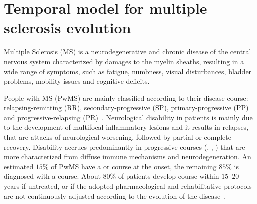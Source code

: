 
\chapter{Temporal model for multiple sclerosis evolution} \label{chap:aism}


Multiple Sclerosis (MS) is a neurodegenerative and chronic disease of the central nervous system characterized by damages to the myelin sheaths, resulting in a wide range of symptoms, such as fatigue, numbness, visual disturbances, bladder problems, mobility issues and cognitive deficits.


People with MS (PwMS) are mainly classified according to their disease course:
relapsing-remitting (\ac{RR}), secondary-progressive (\ac{SP}), primary-progressive (\ac{PP}) and progressive-relapsing (\ac{PR})~\cite{giovannoni2016brain}.
Neurological disability in \RR patients is mainly due to the development of multifocal inflammatory lesions and it results in relapses, that are attacks of neurological worsening, followed by partial or complete recovery. Disability accrues predominantly in progressive courses (\SP, \PP, \PR) that are more characterized from diffuse immune mechanisms and neurodegeneration.
An estimated $15\%$ of PwMS have a \PP or \PR course at the onset, the remaining $85\%$ is diagnosed with a \RR course.
About $80\%$ of \RR patients develop \SP course within $15\text{--}20$ years if untreated, or if the adopted pharmacological and rehabilitative protocols are not continuously adjusted according to the evolution of the disease~\cite{scalfari2014onset}.



